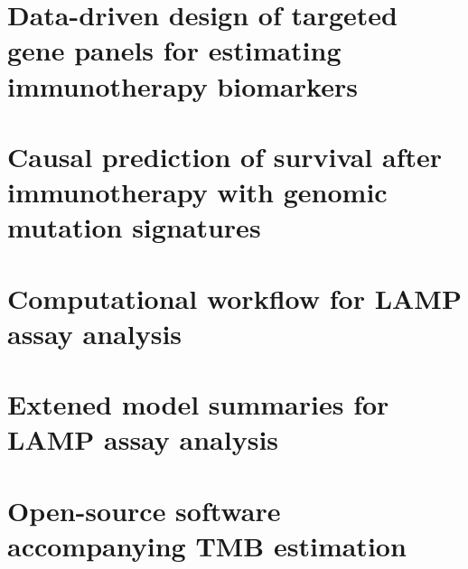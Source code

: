 \documentclass[12pt,twoside,openright]{report}
\theoremstyle{definition}
\begin{document}


\chapter{Data-driven design of targeted gene panels for estimating immunotherapy biomarkers \label{chap:tmb_estimation}}



\chapter{Causal prediction of survival after immunotherapy with genomic mutation signatures \label{chap:causal_genomics}}






\appendix

\chapter{Computational workflow for LAMP assay analysis}


\chapter{Extened model summaries for LAMP assay analysis}


\chapter{Open-source software accompanying TMB estimation}

\end{document}
